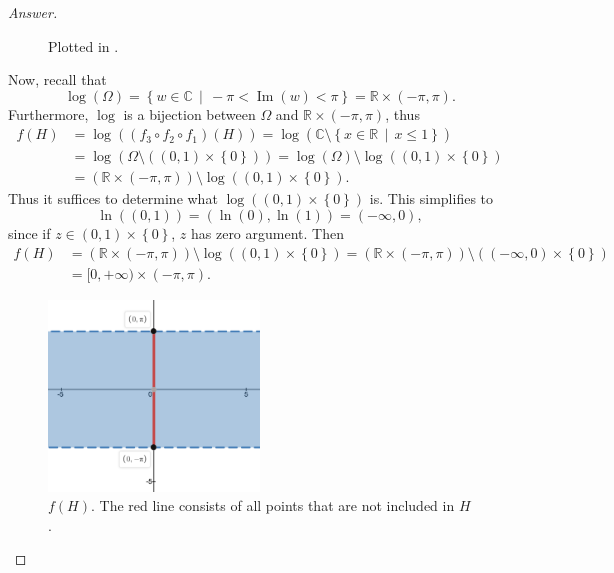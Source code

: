 \documentclass[12pt]{article}
\newcommand{\cx}{\mathbb{C}}
\newcommand{\real}{\mathbb{R}}
\newcommand\paren[1]{\left( #1 \right)}
\newcommand\setb[1]{\left \{ #1 \right \}}
\theoremstyle{definition}
\DeclareMathOperator\im{Im}
\begin{document}
\begin{proof}[Answer]
\begin{figure}[H]
\begin{subfigure}{0.45\textwidth}
            \subcaption{$\paren{ f_3 \circ f_2 \circ f_1 }(H)$.}
            \label{fig:13d}
        \end{subfigure}
        \caption{Plotted in \cite{Desmos}.}
    \end{figure}
    Now, recall that 
    \[
        \log(\Omega) = \setb{ w \in \cx \, \middle| \, -\pi < \im(w) < \pi  } = \real \times (-\pi,\pi) . 
    \]
    Furthermore, $\log$ is a bijection between $\Omega$ and $\real \times (-\pi,\pi)$, thus 
    \begin{align*}
        f(H) & = \log \paren{ \paren{ f_3 \circ f_2 \circ f_1 }(H) } = \log \paren{ \cx \setminus \setb{x \in \real \, \middle| \, x \leq 1 } } \\ 
        & = \log \paren{ \Omega \setminus \paren{ (0,1) \times \setb{ 0 } } } = \log(\Omega) \setminus \log \paren{ (0,1) \times \setb{ 0 } } \\ 
        & = \paren{ \real \times (-\pi,\pi) } \setminus \log \paren{ (0,1) \times \setb{ 0 } } . 
    \end{align*}
    Thus it suffices to determine what $\log \paren{ (0,1) \times \setb{ 0 } }$ is. This simplifies to 
    \[
        \ln \paren{ (0,1) } = \paren{ \ln(0),\ln(1) } = (-\infty,0) ,
    \]
    since if $z \in (0,1) \times \setb{ 0 }$, $z$ has zero argument. Then 
    \begin{align*}
        f(H) & = \paren{ \real \times (-\pi,\pi) } \setminus \log \paren{ (0,1) \times \setb{ 0 } } = \paren{ \real \times (-\pi,\pi) } \setminus \paren{ (-\infty,0) \times \setb{ 0 } } \\ 
        & = [0,+\infty) \times (-\pi,\pi) . 
    \end{align*}
    \begin{figure}[H]
        \centering
        \includegraphics[width = 0.5\textwidth]{13e.png}
        \caption{$f(H)$. The red line consists of all points that are not included in $H$.}
        \label{fig:13e}
    \end{figure}
\end{proof}
\end{document}
